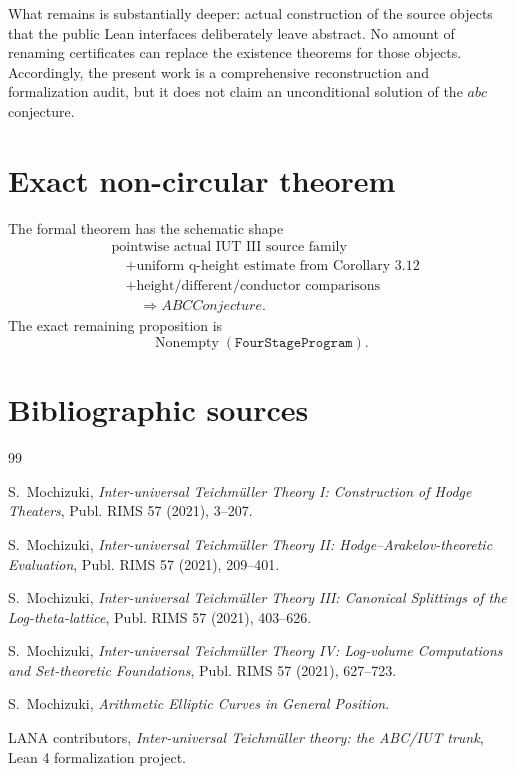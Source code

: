 \documentclass[11pt]{amsart}
\theoremstyle{definition}
\theoremstyle{remark}
\begin{document}
What remains is substantially deeper: actual construction of the source
objects that the public Lean interfaces deliberately leave abstract.  No
amount of renaming certificates can replace the existence theorems for those
objects.  Accordingly, the present work is a comprehensive reconstruction and
formalization audit, but it does not claim an unconditional solution of the
$abc$ conjecture.

\appendix

\section{Exact non-circular theorem}

The formal theorem has the schematic shape
\[
\begin{aligned}
&\text{pointwise actual IUT III source family}\\
&\quad+\text{uniform q-height estimate from Corollary 3.12}\\
&\quad+\text{height/different/conductor comparisons}\\
&\qquad\Longrightarrow ABCConjecture.
\end{aligned}
\]
The exact remaining proposition is
\[
 \operatorname{Nonempty}(\texttt{FourStageProgram}).
\]

\section{Bibliographic sources}

\begin{thebibliography}{99}

S.~Mochizuki,
\emph{Inter-universal Teichm\"uller Theory I: Construction of Hodge Theaters},
Publ. RIMS 57 (2021), 3--207.

S.~Mochizuki,
\emph{Inter-universal Teichm\"uller Theory II: Hodge--Arakelov-theoretic Evaluation},
Publ. RIMS 57 (2021), 209--401.

S.~Mochizuki,
\emph{Inter-universal Teichm\"uller Theory III: Canonical Splittings of the
Log-theta-lattice},
Publ. RIMS 57 (2021), 403--626.

S.~Mochizuki,
\emph{Inter-universal Teichm\"uller Theory IV: Log-volume Computations and
Set-theoretic Foundations},
Publ. RIMS 57 (2021), 627--723.

S.~Mochizuki,
\emph{Arithmetic Elliptic Curves in General Position}.

LANA contributors,
\emph{Inter-universal Teichm\"uller theory: the ABC/IUT trunk},
Lean 4 formalization project.

\end{thebibliography}
\end{document}
